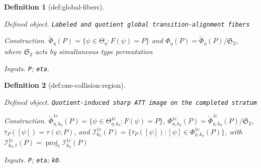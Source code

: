 \documentclass{article}
\newtheorem{definition}{Definition}
\begin{document}
\begin{definition}[def:global-fibers]\label{def:global-fibers}
\par\smallskip\noindent\emph{Defined object.} \texttt{Labeled and quotient global transition-\allowbreak{}alignment fibers}
\par\smallskip\noindent\emph{Construction.} \(\widetilde\Phi_\eta(P)=\{\psi\in\Theta_\eta:F(\psi)=P\}\) and \(\Phi_\eta(P)=\widetilde\Phi_\eta(P)/\mathfrak S_2\), where \(\mathfrak S_2\) acts by simultaneous type permutation
\par\smallskip\noindent\emph{Inputs.} \texttt{P}; \texttt{eta}.
\end{definition}

\begin{definition}[def:one-collision-region]\label{def:one-collision-region}
\par\smallskip\noindent\emph{Defined object.} \texttt{Quotient-\allowbreak{}induced sharp ATT image on the completed stratum}
\par\smallskip\noindent\emph{Construction.} \(\widetilde\Phi_{\eta,k_0}^{1\mathrm c}(P)=\{\psi\in\Theta_{\eta,k_0}^{1\mathrm c}:F(\psi)=P\}\), \(\Phi_{\eta,k_0}^{1\mathrm c}(P)=\widetilde\Phi_{\eta,k_0}^{1\mathrm c}(P)/\mathfrak S_2\), \(\bar\tau_P([\psi])=\tau(\psi;P)\), and \(\mathcal I_{k_0}^{1\mathrm c}(P)=\{\bar\tau_P([\psi]):[\psi]\in\Phi_{\eta,k_0}^{1\mathrm c}(P)\}\), with \(\mathcal I_{k_0,t}^{1\mathrm c}(P)=\operatorname{proj}_t\mathcal I_{k_0}^{1\mathrm c}(P)\)
\par\smallskip\noindent\emph{Inputs.} \texttt{P}; \texttt{eta}; \texttt{k0}.
\end{definition}
\end{document}
